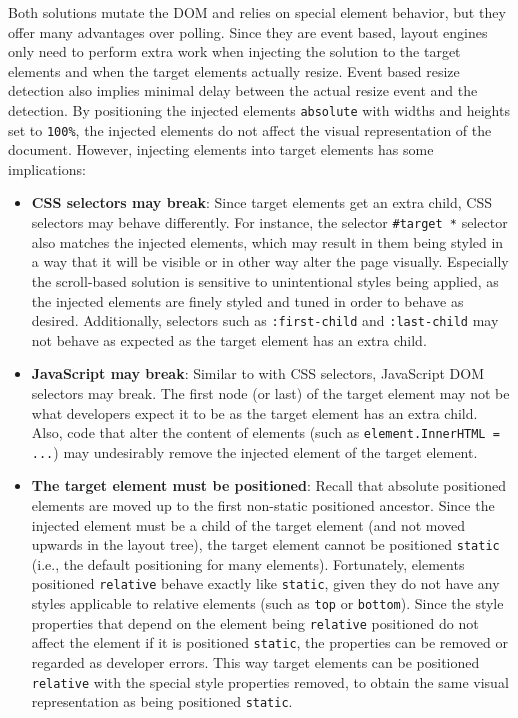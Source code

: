 \documentclass[a4paper,11pt]{kth-mag}
\newcommand{\code}[1]{\texttt{#1}}
\begin{document}
        Both solutions mutate the \gls{DOM} and relies on special \gls{element} behavior, but they offer many advantages over polling.
        Since they are event based, layout engines only need to perform extra work when injecting the solution to the target \glspl{element} and when the target \glspl{element} actually resize.
        Event based resize detection also implies minimal delay between the actual resize event and the detection.
        By positioning the injected elements \code{absolute} with widths and heights set to \code{100\%}, the injected \glspl{element} do not affect the visual representation of the \gls{document}.
        However, injecting elements into target \glspl{element} has some implications:
        \begin{itemize}
          \item \textbf{\gls{CSS} selectors may break}:
            Since target \glspl{element} get an extra child, \gls{CSS} selectors may behave differently.
            For instance, the selector \code{\#target~*} selector also matches the injected \glspl{element}, which may result in them being styled in a way that it will be visible or in other way alter the page visually.
            Especially the scroll-based solution is sensitive to unintentional styles being applied, as the injected elements are finely styled and tuned in order to behave as desired.
            Additionally, selectors such as \code{:first-child} and \code{:last-child} may not behave as expected as the target element has an extra child.
          \item \textbf{\gls{JavaScript} may break}:
            Similar to with \gls{CSS} selectors, \gls{JavaScript} \gls{DOM} selectors may break.
            The first node (or last) of the target \gls{element} may not be what developers expect it to be as the target element has an extra child.
            Also, code that alter the content of \glspl{element} (such as \code{element.InnerHTML = ...}) may undesirably remove the injected \gls{element} of the target element.
          \item \textbf{The target \gls{element} must be positioned}:
            Recall that absolute positioned \glspl{element} are moved up to the first non-static positioned ancestor.
            Since the injected element must be a child of the target \gls{element} (and not moved upwards in the layout tree), the target \gls{element} cannot be positioned \code{static} (i.e., the default positioning for many \glspl{element}).
            Fortunately, \glspl{element} positioned \code{relative} behave exactly like \code{static}, given they do not have any styles applicable to relative elements (such as \code{top} or \code{bottom}).
            Since the style properties that depend on the \gls{element} being \code{relative} positioned do not affect the \gls{element} if it is positioned \code{static}, the properties can be removed or regarded as developer errors.
            This way target \glspl{element} can be positioned \code{relative} with the special style properties removed, to obtain the same visual representation as being positioned \code{static}.
        \end{itemize}
\end{document}
